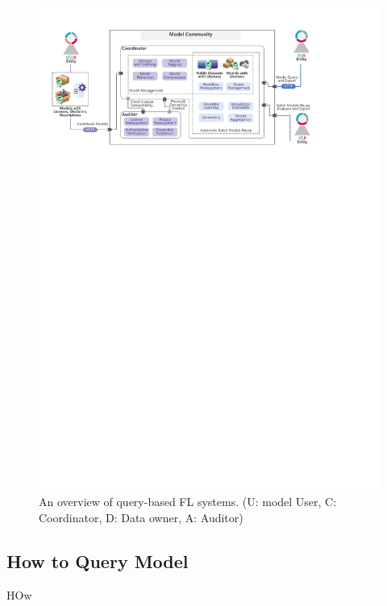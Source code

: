 \begin{figure}[t]
  \centering
  \includegraphics[width=\linewidth]{fig/query_frame.pdf}
  \caption{An overview of query-based FL systems. (U: model User, C: Coordinator, D: Data owner, A: Auditor)}
  \Description{}
  \label{fig:query}
\end{figure}

\subsection{How to Query Model}


HOw


